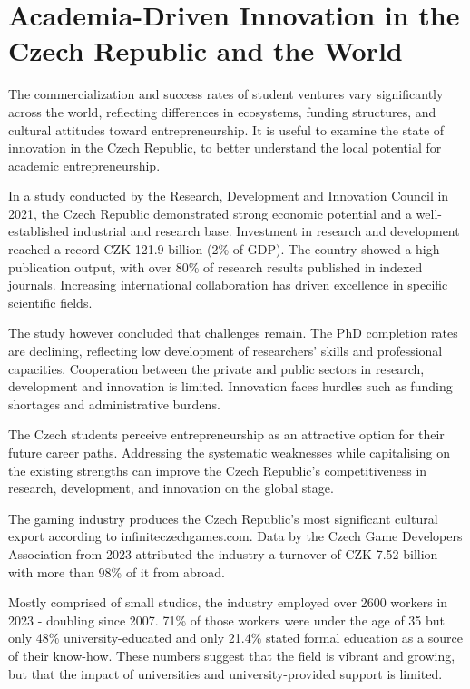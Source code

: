 \section{Academia-Driven Innovation in the Czech Republic and the World}
The commercialization and success rates of student ventures vary significantly across the world, reflecting differences in ecosystems, funding structures, and cultural attitudes toward entrepreneurship. It is useful to examine the state of innovation in the Czech Republic, to better understand the local potential for academic entrepreneurship.

In a study conducted by the Research, Development and Innovation Council in 2021, the Czech Republic demonstrated strong economic potential and a well-established industrial and research base. Investment in research and development reached a record CZK 121.9 billion (2\% of GDP). The country showed a high publication output, with over 80\% of research results published in indexed journals. Increasing international collaboration has driven excellence in specific scientific fields.

The study however concluded that challenges remain. The PhD completion rates are declining, reflecting low development of researchers' skills and professional capacities. Cooperation between the private and public sectors in research, development and innovation is limited. Innovation faces hurdles such as funding shortages and administrative burdens.

The Czech students perceive entrepreneurship as an attractive option for their future career paths. Addressing the systematic weaknesses while capitalising on the existing strengths can improve the Czech Republic’s competitiveness in research, development, and innovation on the global stage.

The gaming industry produces the Czech Republic’s most significant cultural export according to infiniteczechgames.com. Data by the Czech Game Developers Association from 2023 attributed the industry a turnover of CZK 7.52 billion with more than 98\% of it from abroad.

Mostly comprised of small studios, the industry employed over 2600 workers in 2023 - doubling since 2007. 71\% of those workers were under the age of 35 but only 48\% university-educated and only 21.4\% stated formal education as a source of their know-how. These numbers suggest that the field is vibrant and growing, but that the impact of universities and university-provided support is limited.

